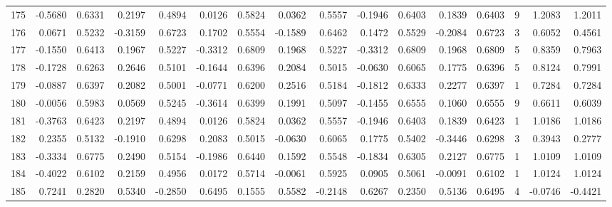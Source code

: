 \begin{tabular}{lrrrrrrrrrrrrrrr}
175 &     -0.5680 &  0.6331 &  0.2197 &  0.4894 &  0.0126 &  0.5824 &  0.0362 &  0.5557 & -0.1946 &  0.6403 &   0.1839 &     0.6403 &      9 &                    1.2083 &                     1.2011 \\
176 &      0.0671 &  0.5232 & -0.3159 &  0.6723 &  0.1702 &  0.5554 & -0.1589 &  0.6462 &  0.1472 &  0.5529 &  -0.2084 &     0.6723 &      3 &                    0.6052 &                     0.4561 \\
177 &     -0.1550 &  0.6413 &  0.1967 &  0.5227 & -0.3312 &  0.6809 &  0.1968 &  0.5227 & -0.3312 &  0.6809 &   0.1968 &     0.6809 &      5 &                    0.8359 &                     0.7963 \\
178 &     -0.1728 &  0.6263 &  0.2646 &  0.5101 & -0.1644 &  0.6396 &  0.2084 &  0.5015 & -0.0630 &  0.6065 &   0.1775 &     0.6396 &      5 &                    0.8124 &                     0.7991 \\
179 &     -0.0887 &  0.6397 &  0.2082 &  0.5001 & -0.0771 &  0.6200 &  0.2516 &  0.5184 & -0.1812 &  0.6333 &   0.2277 &     0.6397 &      1 &                    0.7284 &                     0.7284 \\
180 &     -0.0056 &  0.5983 &  0.0569 &  0.5245 & -0.3614 &  0.6399 &  0.1991 &  0.5097 & -0.1455 &  0.6555 &   0.1060 &     0.6555 &      9 &                    0.6611 &                     0.6039 \\
181 &     -0.3763 &  0.6423 &  0.2197 &  0.4894 &  0.0126 &  0.5824 &  0.0362 &  0.5557 & -0.1946 &  0.6403 &   0.1839 &     0.6423 &      1 &                    1.0186 &                     1.0186 \\
182 &      0.2355 &  0.5132 & -0.1910 &  0.6298 &  0.2083 &  0.5015 & -0.0630 &  0.6065 &  0.1775 &  0.5402 &  -0.3446 &     0.6298 &      3 &                    0.3943 &                     0.2777 \\
183 &     -0.3334 &  0.6775 &  0.2490 &  0.5154 & -0.1986 &  0.6440 &  0.1592 &  0.5548 & -0.1834 &  0.6305 &   0.2127 &     0.6775 &      1 &                    1.0109 &                     1.0109 \\
184 &     -0.4022 &  0.6102 &  0.2159 &  0.4956 &  0.0172 &  0.5714 & -0.0061 &  0.5925 &  0.0905 &  0.5061 &  -0.0091 &     0.6102 &      1 &                    1.0124 &                     1.0124 \\
185 &      0.7241 &  0.2820 &  0.5340 & -0.2850 &  0.6495 &  0.1555 &  0.5582 & -0.2148 &  0.6267 &  0.2350 &   0.5136 &     0.6495 &      4 &                   -0.0746 &                    -0.4421 \\

\end{tabular}
